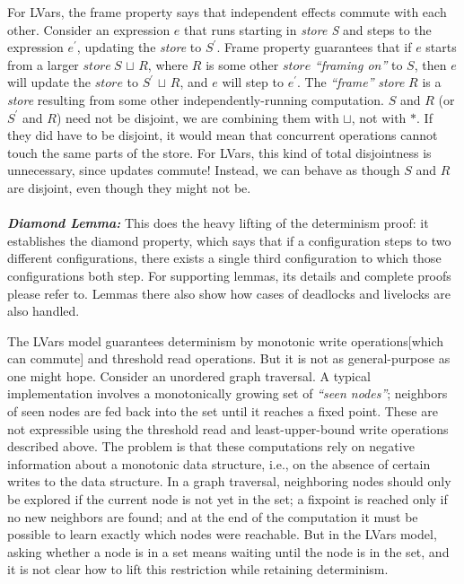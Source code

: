 \documentclass[twocolumn]{article}
\begin{document}
For LVars, the frame property says that independent effects commute with each other. Consider an expression $e$ that runs starting in \emph{store S} and steps to the expression $e^{'}$, updating the \emph{store} to $S^{'}$. Frame property guarantees that if $e$ starts from a larger $store\ S$ $\sqcup$ $R$, where $R$ is some other $store$ \emph{“framing on”} to $S$, then $e$  will update the $store$ to $S^{′}$ $\sqcup$ $R$, and $e$ will step to $e^{′}$. The \emph{“frame”} \emph{store} $R$  is a \emph{store} resulting from some other independently-running computation. $S$ and $R$ (or $S^{′}$ and $R$) need not be disjoint, we are combining them with $\sqcup$, not with $\ast$. If they did have to be disjoint, it would mean that concurrent operations cannot touch the same parts of the store. For LVars, this kind of total disjointness is unnecessary, since updates commute! Instead, we can behave as though $S$ and $R$ are disjoint, even though they might not be. \\ \\
\textbf{\textit{Diamond Lemma:}} This does the heavy lifting of the determinism proof: it establishes the diamond property, which says that if a configuration steps to two different configurations, there exists a single third configuration to which those configurations both step. For supporting lemmas, its details and complete proofs please refer to\cite{lkuper}. Lemmas there also show how cases of deadlocks and livelocks are also handled.

The LVars model guarantees determinism by monotonic write operations[which can commute] and threshold read operations. But it is not as general-purpose as one might hope. Consider an unordered graph traversal. A typical implementation involves a monotonically growing set of \emph{“seen nodes”}; neighbors of seen nodes are fed back into the set until it reaches a fixed point. These are not expressible using the threshold read and least-upper-bound write operations described above. The problem is that these computations rely on negative information about a monotonic data structure, i.e., on the absence of certain writes to the data structure. In a graph traversal, neighboring nodes should only be explored if the current node is not yet in the set; a fixpoint is reached only if no new neighbors are found; and at the end of the computation it must be possible to learn exactly which nodes were reachable. But in the LVars model, asking whether a node is in a set means waiting until the node is in the set, and it is not clear how to lift this restriction while retaining determinism.
\end{document}
